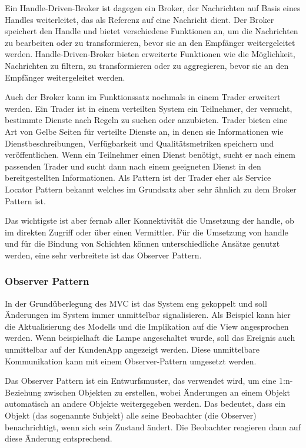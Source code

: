 Ein Handle-Driven-Broker ist dagegen ein Broker, der Nachrichten auf Basis eines Handles weiterleitet, das als Referenz auf eine Nachricht dient. Der Broker speichert den Handle und bietet verschiedene Funktionen an, um die Nachrichten zu bearbeiten oder zu transformieren, bevor sie an den Empfänger weitergeleitet werden. Handle-Driven-Broker bieten erweiterte Funktionen wie die Möglichkeit, Nachrichten zu filtern, zu transformieren oder zu aggregieren, bevor sie an den Empfänger weitergeleitet werden.

Auch der Broker kann im Funktionssatz nochmals in einem Trader erweitert werden. Ein Trader ist in einem verteilten System ein Teilnehmer, der versucht, bestimmte Dienste nach Regeln zu suchen oder anzubieten. Trader bieten eine Art von Gelbe Seiten für verteilte Dienste an, in denen sie Informationen wie Dienstbeschreibungen, Verfügbarkeit und Qualitätsmetriken speichern und veröffentlichen. Wenn ein Teilnehmer einen Dienst benötigt, sucht er nach einem passenden Trader und sucht dann nach einem geeigneten Dienst in den bereitgestellten Informationen. Als Pattern ist der Trader eher als Service Locator Pattern bekannt welches im Grundsatz aber sehr ähnlich zu dem Broker Pattern ist. 

Das wichtigste ist aber fernab aller Konnektivität die Umsetzung der handle, ob im direkten Zugriff oder über einen Vermittler. Für die Umsetzung von handle und für die Bindung von Schichten können unterschiedliche Ansätze genutzt werden, eine sehr verbreitete ist das Observer Pattern. 

\subsubsection{Observer Pattern}
In der Grundüberlegung des MVC ist das System eng gekoppelt und soll Änderungen im System immer unmittelbar signalisieren. Als Beispiel kann hier die Aktualisierung des Modells und die Implikation auf die View angesprochen werden. 
Wenn beispielhaft die Lampe angeschaltet wurde, soll das Ereignis auch unmittelbar auf der KundenApp angezeigt werden. 
Diese unmittelbare Kommunikation kann mit einem Observer-Pattern umgesetzt werden. 

Das Observer Pattern ist ein Entwurfsmuster, das verwendet wird, um eine 1:n-Beziehung zwischen Objekten zu erstellen, wobei Änderungen an einem Objekt automatisch an andere Objekte weitergegeben werden. Das bedeutet, dass ein Objekt (das sogenannte Subjekt) alle seine Beobachter (die Observer) benachrichtigt, wenn sich sein Zustand ändert. Die Beobachter reagieren dann auf diese Änderung entsprechend.

